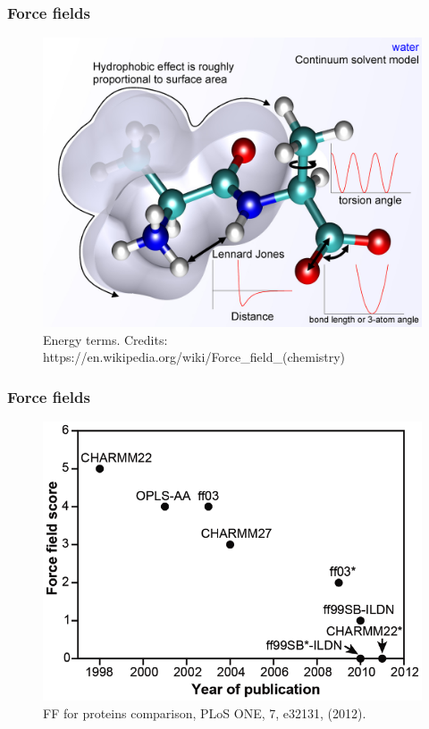 \documentclass{beamer}
\begin{document}
\begin{frame}\frametitle{Force fields}

\begin{figure}
\includegraphics[scale=1.441]{1024px-MM_PEF.png}
\caption{{\scriptsize Energy terms. Credits: https://en.wikipedia.org/wiki/Force\_field\_(chemistry)}}
\end{figure}


\end{frame}

\begin{frame}\frametitle{Force fields}

\begin{figure}
\includegraphics[scale=0.34]{ff_comparison.png}
\caption{{\scriptsize FF for proteins comparison, PLoS ONE, 7, e32131, (2012).}}
\end{figure}


\end{frame}
\end{document}
